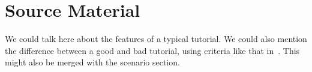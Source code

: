 \section{Source Material}

We could talk here about the features of a typical tutorial.
We could also mention the difference between a good and bad tutorial, using criteria like that in~\cite{lount_characterizing_2014}.
This might also be merged with the scenario section.
